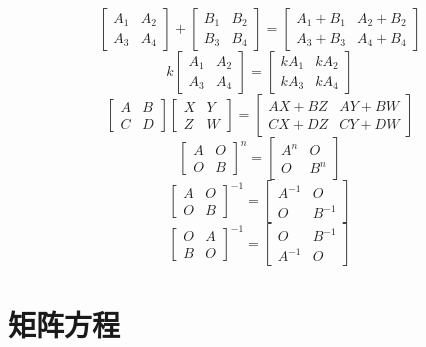 \[\begin{bmatrix}
A_1 & A_2 \\ 
A_3 & A_4
\end{bmatrix} + 
\begin{bmatrix}
B_1 & B_2 \\ 
B_3 & B_4
\end{bmatrix} = 
\begin{bmatrix}
A_1 + B_1 & A_2 + B_2 \\ 
A_3 + B_3 & A_4 + B_4
\end{bmatrix}\]
\[k\begin{bmatrix}
A_1 & A_2 \\ 
A_3 & A_4
\end{bmatrix} = 
\begin{bmatrix}
kA_1 & kA_2 \\ 
kA_3 & kA_4
\end{bmatrix}\]
\[\begin{bmatrix}
A & B \\ 
C & D
\end{bmatrix}
\begin{bmatrix}
X & Y \\ 
Z & W
\end{bmatrix} = 
\begin{bmatrix}
AX + BZ & AY + BW \\ 
CX + DZ & CY + DW
\end{bmatrix}\]
\[\begin{bmatrix}
A & O \\ 
O & B
\end{bmatrix}^n = 
\begin{bmatrix}
A^n & O \\ 
O & B^n
\end{bmatrix}\]
\[\begin{bmatrix}
A & O \\ 
O & B
\end{bmatrix}^{-1} = 
\begin{bmatrix}
A^{-1} & O \\ 
O & B^{-1}
\end{bmatrix}\]
\[\begin{bmatrix}
O & A \\ 
B & O
\end{bmatrix}^{-1} = 
\begin{bmatrix}
O & B^{-1} \\ 
A^{-1} & O
\end{bmatrix}\]


\section{矩阵方程}


